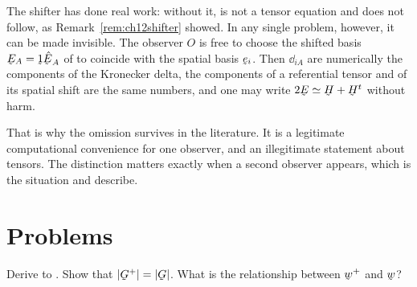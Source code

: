 \begin{remark}%
\label{rem:ch12disappear}
The shifter has done real work: without it,  is not a tensor
equation and  does not follow, as
Remark~\ref{rem:ch12shifter} showed. In any single problem, however, it
can be made invisible. The observer $O$ is free to choose the shifted
basis $\bE_{A}=\shift\hbE_{A}$ of  to coincide with the
spatial basis $\be_{i}$. Then $\dd_{iA}$ are numerically the components
of the Kronecker delta, the components of a referential tensor and of
its spatial shift are the same numbers, and one may write
$2\bE\simeq\bH+\bH^{t}$ without harm.

That is why the omission survives in the literature. It is a legitimate
computational convenience for one observer, and an illegitimate
statement about tensors. The distinction matters exactly when a second
observer appears, which is the situation  and 
describe.
\end{remark}

\setcounter{problemenv}{0}
\section{Problems}\label{sec:problems:c12}

\begin{problem}
Derive  to . Show that $|\bG^{+}|=|\bG|$. What is
the relationship between $\bw^{+}$ and $\bw$?
\end{problem}


